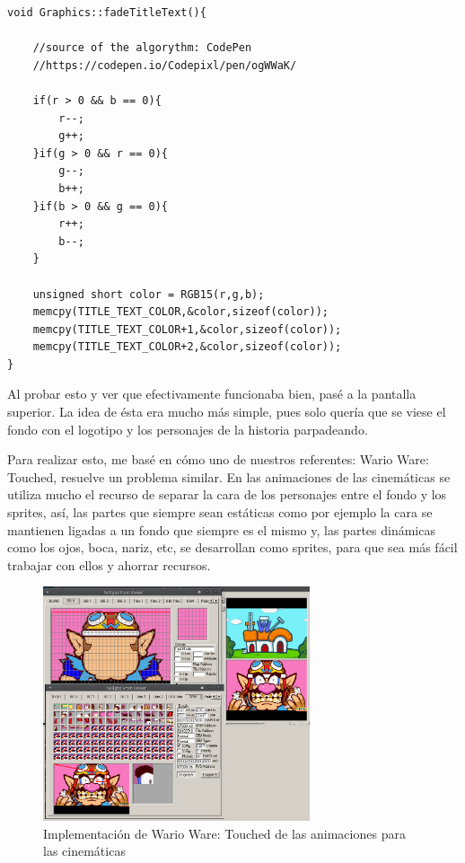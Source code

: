    \begin{lstlisting}[caption={Animación del texto}, label={code:fadergb}]
void Graphics::fadeTitleText(){

    //source of the algorythm: CodePen
    //https://codepen.io/Codepixl/pen/ogWWaK/

    if(r > 0 && b == 0){
        r--;
        g++;
    }if(g > 0 && r == 0){
        g--;
        b++;
    }if(b > 0 && g == 0){
        r++;
        b--;
    }

    unsigned short color = RGB15(r,g,b);
    memcpy(TITLE_TEXT_COLOR,&color,sizeof(color));
    memcpy(TITLE_TEXT_COLOR+1,&color,sizeof(color));
    memcpy(TITLE_TEXT_COLOR+2,&color,sizeof(color));
}

\end{lstlisting}

 \vspace{0.5cm}

Al probar esto y ver que efectivamente funcionaba bien, pasé a la pantalla superior. La idea de ésta era mucho más simple, pues solo quería que se viese el fondo con el logotipo y los personajes de la historia parpadeando.

 \vspace{0.5cm}

Para realizar esto, me basé en cómo uno de nuestros referentes: Wario Ware: Touched, resuelve un problema similar. En las animaciones de las cinemáticas se utiliza mucho el recurso de separar la cara de los personajes entre el fondo y los sprites, así, las partes que siempre sean estáticas como por ejemplo la cara se mantienen ligadas a un fondo que siempre es el mismo y, las partes dinámicas como los ojos, boca, nariz, etc, se desarrollan como sprites, para que sea más fácil trabajar con ellos y ahorrar recursos.

 \vspace{0.5cm}

\begin{figure}[htbp]
\centering
  \includegraphics[width=0.7\textwidth]{archivos/wario_ware_faces.png}
  \caption{Implementación de Wario Ware: Touched de las animaciones para las cinemáticas}
  \label{fig:wario_ware_faces}
\end{figure}


